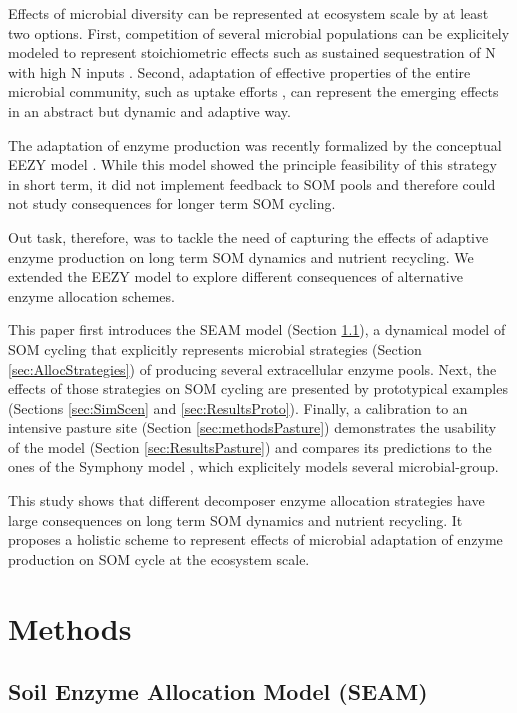 Effects of microbial diversity can be represented at ecosystem scale by at least
two options. First, competition of several microbial populations can be
explicitely modeled to represent stoichiometric effects such as sustained
sequestration of N with high N inputs \citep{Perveen14}.
Second, adaptation of effective properties of the entire microbial community,
such as uptake efforts \citep{Rastetter97, Rastetter11}, can represent the
emerging effects in an abstract but dynamic and adaptive way.

The adaptation of enzyme production was recently
formalized by the conceptual EEZY model \citep{Moorhead12}. While this model
showed the principle feasibility of this strategy in short term, it did not
implement feedback to SOM pools and therefore could not study
consequences for longer term SOM cycling. 

Out task, therefore, was to tackle the need of capturing the effects of adaptive
enzyme production on long term SOM dynamics and nutrient recycling. We extended
the EEZY model to explore different consequences of alternative enzyme
allocation schemes.

This paper first introduces the SEAM model (Section \ref{sec:SEAM}), a
dynamical model of SOM cycling that explicitly represents microbial strategies
(Section \ref{sec:AllocStrategies}) of producing several extracellular enzyme
pools. Next, the effects of those strategies on SOM cycling are presented by
prototypical examples (Sections \ref{sec:SimScen} and \ref{sec:ResultsProto}).
Finally, a calibration to an intensive pasture site (Section
\ref{sec:methodsPasture}) demonstrates the usability of the model (Section
\ref{sec:ResultsPasture}) and compares its predictions to the ones of
the Symphony model \citep{Perveen14}, which explicitely models several
microbial-group.

This study shows that different decomposer enzyme allocation strategies
have large consequences on long term SOM dynamics and nutrient recycling. It
proposes a holistic scheme to represent effects of microbial adaptation of
enzyme production on SOM cycle at the ecosystem scale.


\section{Methods}
\subsection{Soil Enzyme Allocation Model (SEAM)}
\label{sec:SEAM}

